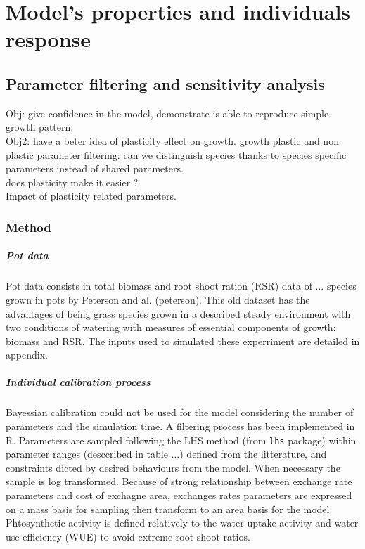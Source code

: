 
\chapter{Model's properties and individuals response}


\section{Parameter filtering and sensitivity analysis}
Obj: give confidence in the model, demonstrate is able to reproduce simple growth pattern.\\
Obj2: have a beter idea of plasticity effect on growth.
growth plastic and non plastic parameter filtering: can we distinguish species thanks to species specific parameters instead of shared parameters.\\
does plasticity make it easier ?\\
Impact of plasticity related parameters.\\

\subsection{Method}

\paragraph{Pot data}
Pot data consists in total biomass and root shoot ration (RSR) data of ... species grown in pots by Peterson and al. (peterson). This old dataset has the advantages of being grass species grown in a described steady environment with two conditions of watering with measures of essential components of growth: biomass and RSR. The inputs used to simulated these experriment are detailed in appendix.

\paragraph{Individual calibration process}
Bayessian calibration could not be used for the model considering the number of parameters and the simulation time. A filtering process has been implemented in R. Parameters are sampled following the LHS method (from \texttt{lhs} package)	within parameter ranges (desccribed in table ...) defined from the litterature, and constraints dicted by desired behaviours from the model. When necessary the sample is log transformed. Because of strong relationship between exchange rate parameters and cost of exchagne area, exchanges rates parameters are expressed on a mass basis for sampling then transform to an area basis for the model. Phtosynthetic activity is defined relatively to the water uptake activity and water use efficiency (WUE) to avoid extreme root shoot ratios.\\

